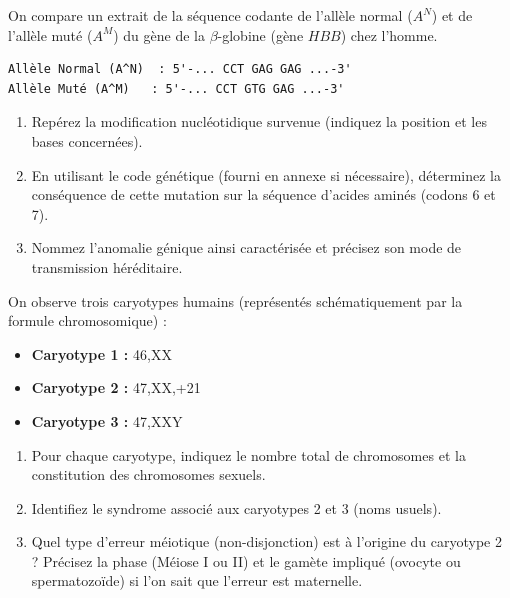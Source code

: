 \documentclass[11pt]{article}
\begin{document}
\begin{exercice}
On compare un extrait de la séquence codante de l'allèle normal ($A^N$) et de l'allèle muté ($A^M$) du gène de la $\beta$-globine (gène $HBB$) chez l'homme.

\begin{verbatim}
Allèle Normal (A^N)  : 5'-... CCT GAG GAG ...-3'
Allèle Muté (A^M)   : 5'-... CCT GTG GAG ...-3'
\end{verbatim}
\begin{enumerate}
    \item Repérez la modification nucléotidique survenue (indiquez la position et les bases concernées).
    \item En utilisant le code génétique (fourni en annexe si nécessaire), déterminez la conséquence de cette mutation sur la séquence d'acides aminés (codons 6 et 7).
    \item Nommez l'anomalie génique ainsi caractérisée et précisez son mode de transmission héréditaire.
\end{enumerate}
\end{exercice}

\begin{exercice}
On observe trois caryotypes humains (représentés schématiquement par la formule chromosomique) :
\begin{itemize}
    \item \textbf{Caryotype 1 :} 46,XX
    \item \textbf{Caryotype 2 :} 47,XX,+21
    \item \textbf{Caryotype 3 :} 47,XXY
\end{itemize}
\begin{enumerate}
    \item Pour chaque caryotype, indiquez le nombre total de chromosomes et la constitution des chromosomes sexuels.
    \item Identifiez le syndrome associé aux caryotypes 2 et 3 (noms usuels).
    \item Quel type d'erreur méiotique (non-disjonction) est à l'origine du caryotype 2 ? Précisez la phase (Méiose I ou II) et le gamète impliqué (ovocyte ou spermatozoïde) si l'on sait que l'erreur est maternelle.
\end{enumerate}
\end{exercice}
\end{document}
